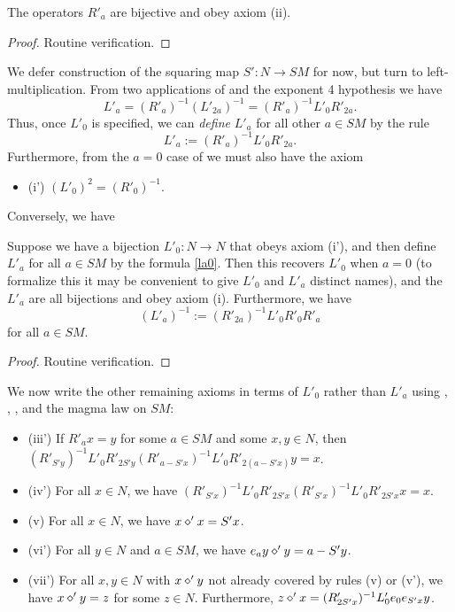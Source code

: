 \begin{lemma}\label{ra-prop}\leanok  The operators $R'_a$ are bijective and obey axiom (ii).
\end{lemma}

\begin{proof}\leanok Routine verification.
\end{proof}

We defer construction of the squaring map $S': N \to SM$ for now, but turn to left-multiplication. From two applications of  and the exponent 4 hypothesis we have
$$ L'_a = (R'_a)^{-1} (L'_{2a})^{-1} = (R'_a)^{-1} L'_0 R'_{2a}.$$
Thus, once $L'_0$ is specified, we can \emph{define} $L'_a$ for all other $a \in SM$ by the rule
\begin{equation}\label{la0}
  L'_a := (R'_a)^{-1} L'_0 R'_{2a}.
\end{equation}
Furthermore, from the $a=0$ case of  we must also have the axiom
\begin{itemize}
  \item (i') $(L'_0)^2 = (R'_0)^{-1}$.
\end{itemize}

Conversely, we have

\begin{lemma}\label{l0-la}\leanok  Suppose we have a bijection $L'_0: N \to N$ that obeys axiom (i'), and then define $L'_a$ for all $a \in SM$ by the formula \eqref{la0}.  Then this recovers $L'_0$ when $a=0$ (to formalize this it may be convenient to give $L'_0$ and $L'_a$ distinct names), and the $L'_a$ are all bijections and obey axiom (i).  Furthermore, we have
\begin{equation}\label{la1}
  (L'_a)^{-1} := (R'_{2a})^{-1} L'_0 R'_0 R'_{a}
\end{equation}
for all $a \in SM$.
\end{lemma}

\begin{proof}\leanok Routine verification.
\end{proof}

We now write the other remaining axioms in terms of $L'_0$ rather than $L'_a$ using , , , and the magma law on $SM$:
\begin{itemize}
\item (iii')  If $R'_a x = y$ for some $a \in SM$ and some $x,y \in N$, then $(R'_{S'y})^{-1} L'_0 R'_{2S'y} (R'_{a - S'x})^{-1} L'_0 R'_{2(a - S'x)} y = x$.
\item (iv')  For all $x \in N$, we have $(R'_{S'x})^{-1} L'_0 R'_{2S'x} (R'_{S'x})^{-1} L'_0 R'_{2S'x} x = x$.
\item (v)  For all $x \in N$, we have $x \diamond' x = S'x$.
\item (vi')  For all $y \in N$ and $a \in SM$, we have $e_a y \diamond' y = a - S'y$.
\item (vii')  For all $x,y \in N$ with $x \diamond' y$ not already covered by rules (v) or (v'), we have $x \diamond' y = z$ for some $z \in N$.  Furthermore, $z \diamond' x = (R'_{2S'x})^{-1} L'_0 e_0 e_{S'x} y$.
\end{itemize}

